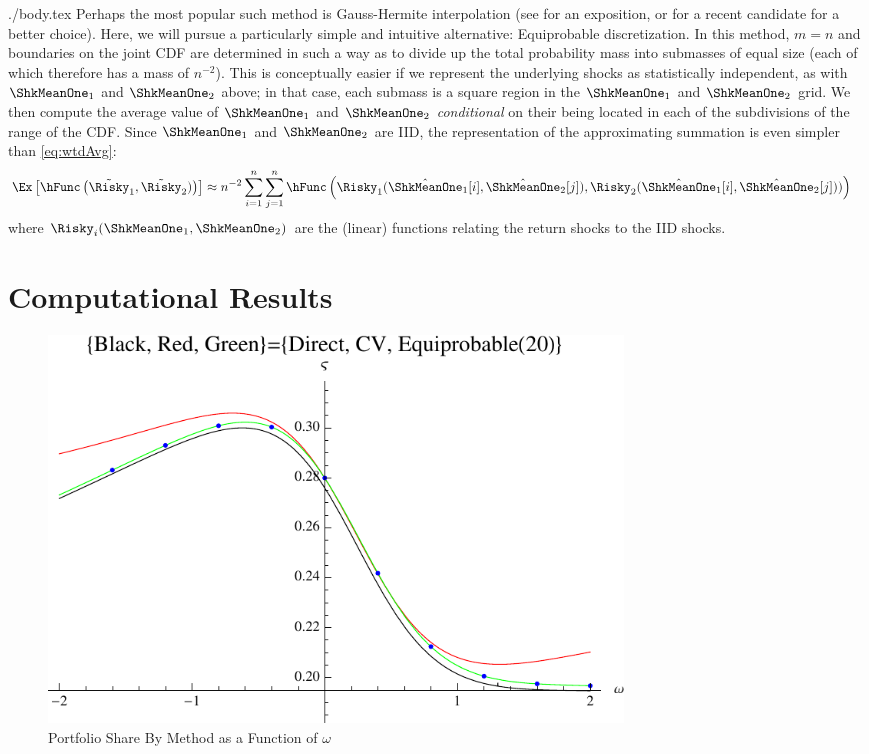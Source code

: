 \documentclass{handout}
\begin{document}
\begin{verbatimwrite}{./body.tex}
Perhaps the most popular such method is Gauss-Hermite interpolation
(see \cite{judd:book} for an exposition, or \cite{kopecky2010finite}
for a recent candidate for a better choice).  Here, we will pursue a
particularly simple and intuitive alternative: Equiprobable discretization.  In
this method, $m=n$ and boundaries on the joint CDF are determined in
such a way as to divide up the total probability mass into submasses
of equal size (each of which therefore has a mass of $n^{-2}$).  This
is conceptually easier if we represent the underlying shocks as
statistically independent, as with $\ShkMeanOne_{1}$ and
$\ShkMeanOne_{2}$ above; in that case, each submass is a square region
in the $\ShkMeanOne_{1}$ and $\ShkMeanOne_{2}$ grid.  We then compute
the average value of $\ShkMeanOne_{1}$ and $\ShkMeanOne_{2}$ {\it
  conditional} on their being located in each of the subdivisions of
the range of the CDF.  Since $\ShkMeanOne_{1}$ and $\ShkMeanOne_{2}$
are IID, the representation of the approximating summation is even
simpler than \eqref{eq:wtdAvg}:
\begin{equation*}\begin{gathered}\begin{aligned}
  \Ex\left[\hFunc\left(\tilde{\Risky}_{1},\tilde{\Risky}_{2})\right)\right] & \approx  n^{-2} \sum_{i=1}^{n}\sum_{j=1}^{n} \hFunc\left(\Risky_{1}(\hat{\ShkMeanOne}_{1}[i],\hat{\ShkMeanOne}_{2}[j]),\Risky_{2}(\hat{\ShkMeanOne}_{1}[i],\hat{\ShkMeanOne}_{2}[j]))\right) \label{eq:wtdAvgMod}
\end{aligned}\end{gathered}\end{equation*}
where $\Risky_{i}(\ShkMeanOne_{1},\ShkMeanOne_{2})$ are the (linear) functions relating the return shocks to the IID shocks.


\section{Computational Results}
\begin{figure}
\includegraphics[width=6in]{./ShareVsCovByMethod}
\caption{Portfolio Share By Method as a Function of $\omega$}\label{fig:ShareVsCovByMethod}
\end{figure}


\end{verbatimwrite}
\end{document}
